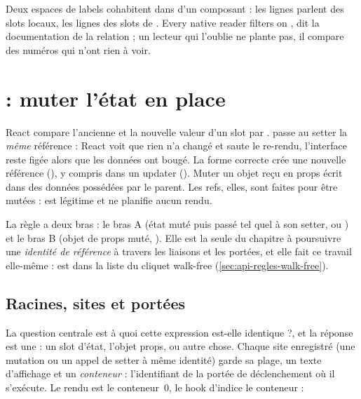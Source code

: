 \begin{piege}
Deux espaces de labels cohabitent dans  d'un composant : les lignes  parlent des slots locaux, les lignes  des slots de . \og Every native reader filters on \fg, dit la documentation de la relation ; un lecteur qui l'oublie ne plante pas, il compare des numéros qui n'ont rien à voir.
\end{piege}

\section{ : muter l'état en place}
\label{sec:regles-etat-mutation}

\begin{react}
React compare l'ancienne et la nouvelle valeur d'un slot par .  passe au setter la \emph{même} référence : React voit que rien n'a changé et saute le re-rendu, l'interface reste figée alors que les données ont bougé. La forme correcte crée une nouvelle référence (), y compris dans un updater (). Muter un objet reçu en props écrit dans des données possédées par le parent. Les refs, elles, sont faites pour être mutées :  est légitime et ne planifie aucun rendu.
\end{react}

La règle a deux bras : le bras A (état muté puis passé tel quel à son setter, \Error{} ou \Warning) et le bras B (objet de props muté, \Warning). Elle est la seule du chapitre à poursuivre une \emph{identité de référence} à travers les liaisons et les portées, et elle fait ce travail elle-même :  est dans la liste du cliquet \og walk-free\fg{} (\cref{sec:api-regles-walk-free}).

\subsection{Racines, sites et portées}


La question centrale est \og à quoi cette expression est-elle identique ?\fg{}, et la réponse est une  : un slot d'état, l'objet props, ou autre chose. Chaque site enregistré (une mutation ou un appel de setter à même identité) garde sa plage, un texte d'affichage et un \emph{conteneur} : l'identifiant de la portée de déclenchement où il s'exécute. Le rendu est le conteneur~0, le hook d'indice  le conteneur  :


